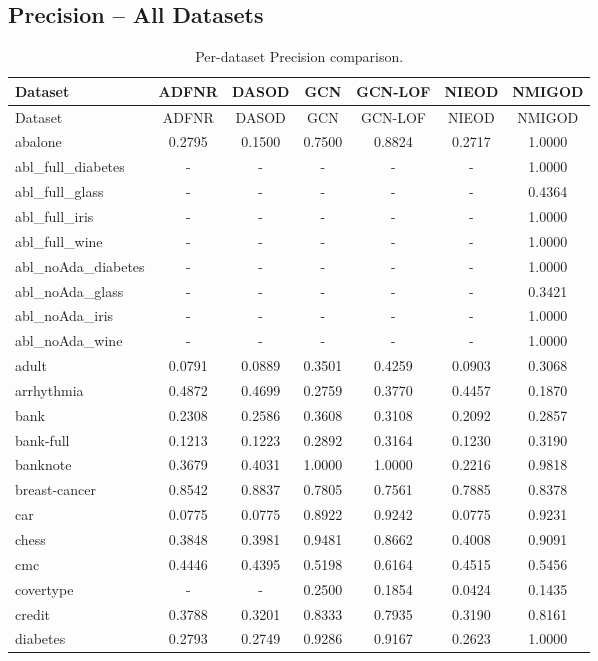 \documentclass[11pt,a4paper]{article}
\begin{document}
\subsection{Precision -- All Datasets}
\begin{longtable}{lcccccc}
\caption{Per-dataset Precision comparison.}\\
\toprule Dataset & ADFNR & DASOD & GCN & GCN-LOF & NIEOD & NMIGOD \\ \midrule
\endfirsthead
\toprule Dataset & ADFNR & DASOD & GCN & GCN-LOF & NIEOD & NMIGOD \\ \midrule
\endhead
abalone & 0.2795 & 0.1500 & 0.7500 & 0.8824 & 0.2717 & 1.0000 \\
abl\_full\_diabetes & - & - & - & - & - & 1.0000 \\
abl\_full\_glass & - & - & - & - & - & 0.4364 \\
abl\_full\_iris & - & - & - & - & - & 1.0000 \\
abl\_full\_wine & - & - & - & - & - & 1.0000 \\
abl\_noAda\_diabetes & - & - & - & - & - & 1.0000 \\
abl\_noAda\_glass & - & - & - & - & - & 0.3421 \\
abl\_noAda\_iris & - & - & - & - & - & 1.0000 \\
abl\_noAda\_wine & - & - & - & - & - & 1.0000 \\
adult & 0.0791 & 0.0889 & 0.3501 & 0.4259 & 0.0903 & 0.3068 \\
arrhythmia & 0.4872 & 0.4699 & 0.2759 & 0.3770 & 0.4457 & 0.1870 \\
bank & 0.2308 & 0.2586 & 0.3608 & 0.3108 & 0.2092 & 0.2857 \\
bank-full & 0.1213 & 0.1223 & 0.2892 & 0.3164 & 0.1230 & 0.3190 \\
banknote & 0.3679 & 0.4031 & 1.0000 & 1.0000 & 0.2216 & 0.9818 \\
breast-cancer & 0.8542 & 0.8837 & 0.7805 & 0.7561 & 0.7885 & 0.8378 \\
car & 0.0775 & 0.0775 & 0.8922 & 0.9242 & 0.0775 & 0.9231 \\
chess & 0.3848 & 0.3981 & 0.9481 & 0.8662 & 0.4008 & 0.9091 \\
cmc & 0.4446 & 0.4395 & 0.5198 & 0.6164 & 0.4515 & 0.5456 \\
covertype & - & - & 0.2500 & 0.1854 & 0.0424 & 0.1435 \\
credit & 0.3788 & 0.3201 & 0.8333 & 0.7935 & 0.3190 & 0.8161 \\
diabetes & 0.2793 & 0.2749 & 0.9286 & 0.9167 & 0.2623 & 1.0000 \\

\end{longtable}
\end{document}
